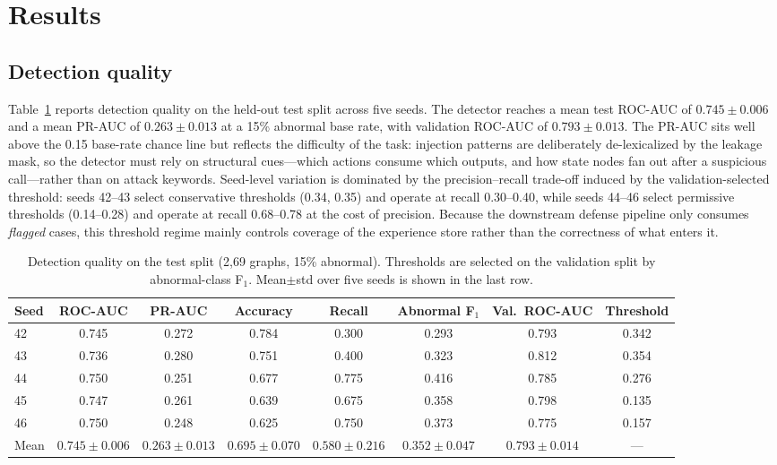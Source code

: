 \section{Results}
\label{sec:results}

\subsection{Detection quality}
\label{sec:results-detection}

Table~\ref{tab:detection} reports detection quality on the held-out test split across five seeds. The detector reaches a mean test ROC-AUC of $0.745\pm0.006$ and a mean PR-AUC of $0.263\pm0.013$ at a 15\% abnormal base rate, with validation ROC-AUC of $0.793\pm0.013$. The PR-AUC sits well above the 0.15 base-rate chance line but reflects the difficulty of the task: injection patterns are deliberately de-lexicalized by the leakage mask, so the detector must rely on structural cues---which actions consume which outputs, and how state nodes fan out after a suspicious call---rather than on attack keywords. Seed-level variation is dominated by the precision--recall trade-off induced by the validation-selected threshold: seeds 42--43 select conservative thresholds (0.34, 0.35) and operate at recall 0.30--0.40, while seeds 44--46 select permissive thresholds (0.14--0.28) and operate at recall 0.68--0.78 at the cost of precision. Because the downstream defense pipeline only consumes \emph{flagged} cases, this threshold regime mainly controls coverage of the experience store rather than the correctness of what enters it.

\begin{table}[t]
\centering
\caption{Detection quality on the \tool{} test split (2{,}69 graphs, 15\% abnormal). Thresholds are selected on the validation split by abnormal-class F$_1$. Mean$\pm$std over five seeds is shown in the last row.}
\label{tab:detection}
\begin{tabular}{lccccccc}
\toprule
Seed & ROC-AUC & PR-AUC & Accuracy & Recall & Abnormal F$_1$ & Val.\ ROC-AUC & Threshold \\
\midrule
42 & 0.745 & 0.272 & 0.784 & 0.300 & 0.293 & 0.793 & 0.342 \\
43 & 0.736 & 0.280 & 0.751 & 0.400 & 0.323 & 0.812 & 0.354 \\
44 & 0.750 & 0.251 & 0.677 & 0.775 & 0.416 & 0.785 & 0.276 \\
45 & 0.747 & 0.261 & 0.639 & 0.675 & 0.358 & 0.798 & 0.135 \\
46 & 0.750 & 0.248 & 0.625 & 0.750 & 0.373 & 0.775 & 0.157 \\
\midrule
Mean & $0.745\pm0.006$ & $0.263\pm0.013$ & $0.695\pm0.070$ & $0.580\pm0.216$ & $0.352\pm0.047$ & $0.793\pm0.014$ & --- \\
\bottomrule
\end{tabular}
\end{table}


